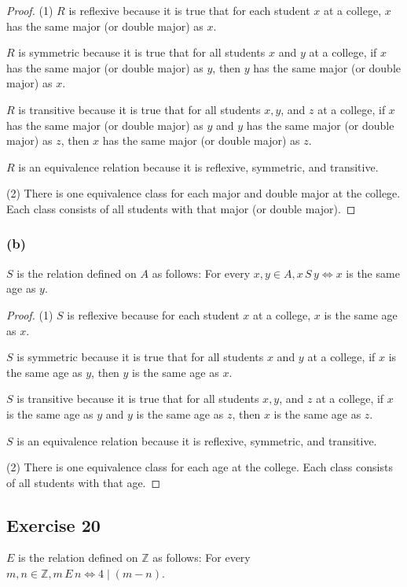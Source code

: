 \documentclass[14pt]{extarticle}
\newcommand{\Z}{\mathbb{Z}}
\begin{document}
\begin{proof}
(1) \(R\) is reflexive because it is true that for each student \(x\) at a college, \(x\) has the same major (or 
double major) as \(x\).

\(R\) is symmetric because it is true that for all students \(x\) and \(y\) at a college, if \(x\) has the same major 
(or double major) as \(y\), then \(y\) has the same major (or double major) as \(x\).

\(R\) is transitive because it is true that for all students \(x, y\), and \(z\) at a college, if \(x\) has the 
same major (or double major) as \(y\) and \(y\) has the same major (or double major) as \(z\), then \(x\) has the 
same major (or double major) as \(z\). 

\(R\) is an equivalence relation because it is reflexive, symmetric, and transitive.

(2) There is one equivalence class for each major and double major at the college. Each class consists of all 
students with that major (or double major).
\end{proof}

\subsubsection{(b)}
\(S\) is the relation defined on \(A\) as follows: For every \(x, y \in A, x \,S\, y \iff x\) is the same age as \(y\).

\begin{proof}
(1) \(S\) is reflexive because for each student \(x\) at a college, \(x\) is the same age as \(x\).

\(S\) is symmetric because it is true that for all students \(x\) and \(y\) at a college, if \(x\) is the same age as 
\(y\), then \(y\) is the same age as \(x\).

\(S\) is transitive because it is true that for all students \(x, y\), and \(z\) at a college, if \(x\) is the 
same age as \(y\) and \(y\) is the same age as \(z\), then \(x\) is the same age as \(z\). 

\(S\) is an equivalence relation because it is reflexive, symmetric, and transitive.

(2) There is one equivalence class for each age at the college. Each class consists of all students with that age.
\end{proof}

\subsection{Exercise 20}
\(E\) is the relation defined on \(\Z\) as follows: For every \(m, n \in \Z, m \,E\, n \iff 4 \mid (m - n)\).
\end{document}

